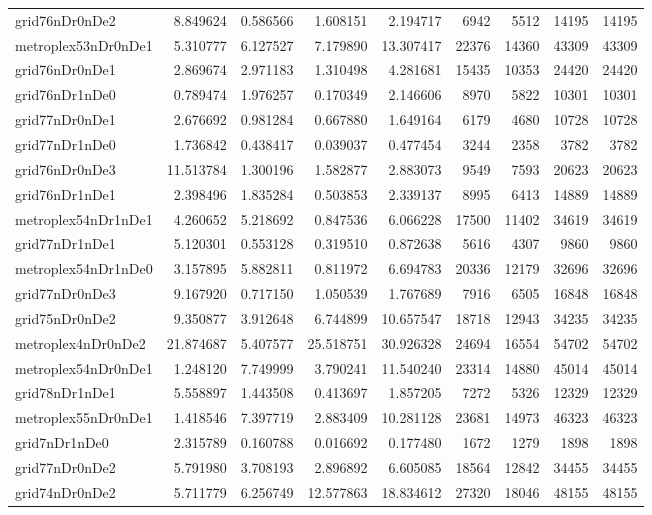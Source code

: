 \begin{longtable}{|l|r|r|r|r|r|r|r|r|}
grid76nDr0nDe2 & 8.849624 & 0.586566 & 1.608151 & 2.194717 & 6942 & 5512 & 14195 & 14195 \\
metroplex53nDr0nDe1 & 5.310777 & 6.127527 & 7.179890 & 13.307417 & 22376 & 14360 & 43309 & 43309 \\
grid76nDr0nDe1 & 2.869674 & 2.971183 & 1.310498 & 4.281681 & 15435 & 10353 & 24420 & 24420 \\
grid76nDr1nDe0 & 0.789474 & 1.976257 & 0.170349 & 2.146606 & 8970 & 5822 & 10301 & 10301 \\
grid77nDr0nDe1 & 2.676692 & 0.981284 & 0.667880 & 1.649164 & 6179 & 4680 & 10728 & 10728 \\
grid77nDr1nDe0 & 1.736842 & 0.438417 & 0.039037 & 0.477454 & 3244 & 2358 & 3782 & 3782 \\
grid76nDr0nDe3 & 11.513784 & 1.300196 & 1.582877 & 2.883073 & 9549 & 7593 & 20623 & 20623 \\
grid76nDr1nDe1 & 2.398496 & 1.835284 & 0.503853 & 2.339137 & 8995 & 6413 & 14889 & 14889 \\
metroplex54nDr1nDe1 & 4.260652 & 5.218692 & 0.847536 & 6.066228 & 17500 & 11402 & 34619 & 34619 \\
grid77nDr1nDe1 & 5.120301 & 0.553128 & 0.319510 & 0.872638 & 5616 & 4307 & 9860 & 9860 \\
metroplex54nDr1nDe0 & 3.157895 & 5.882811 & 0.811972 & 6.694783 & 20336 & 12179 & 32696 & 32696 \\
grid77nDr0nDe3 & 9.167920 & 0.717150 & 1.050539 & 1.767689 & 7916 & 6505 & 16848 & 16848 \\
grid75nDr0nDe2 & 9.350877 & 3.912648 & 6.744899 & 10.657547 & 18718 & 12943 & 34235 & 34235 \\
metroplex4nDr0nDe2 & 21.874687 & 5.407577 & 25.518751 & 30.926328 & 24694 & 16554 & 54702 & 54702 \\
metroplex54nDr0nDe1 & 1.248120 & 7.749999 & 3.790241 & 11.540240 & 23314 & 14880 & 45014 & 45014 \\
grid78nDr1nDe1 & 5.558897 & 1.443508 & 0.413697 & 1.857205 & 7272 & 5326 & 12329 & 12329 \\
metroplex55nDr0nDe1 & 1.418546 & 7.397719 & 2.883409 & 10.281128 & 23681 & 14973 & 46323 & 46323 \\
grid7nDr1nDe0 & 2.315789 & 0.160788 & 0.016692 & 0.177480 & 1672 & 1279 & 1898 & 1898 \\
grid77nDr0nDe2 & 5.791980 & 3.708193 & 2.896892 & 6.605085 & 18564 & 12842 & 34455 & 34455 \\
grid74nDr0nDe2 & 5.711779 & 6.256749 & 12.577863 & 18.834612 & 27320 & 18046 & 48155 & 48155 \\

\end{longtable}

